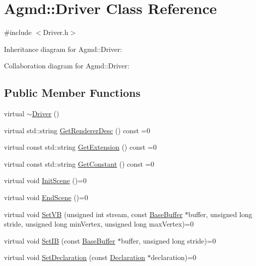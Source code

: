 \hypertarget{class_agmd_1_1_driver}{\section{Agmd\+:\+:Driver Class Reference}
\label{class_agmd_1_1_driver}
}


{\ttfamily \#include $<$Driver.\+h$>$}



Inheritance diagram for Agmd\+:\+:Driver\+:


Collaboration diagram for Agmd\+:\+:Driver\+:
\subsection*{Public Member Functions}
\begin{DoxyCompactItemize}
\item 
virtual \hyperlink{class_agmd_1_1_driver_acd6fcffe1c271f55b8b5c0b89c540f53}{$\sim$\+Driver} ()
\item 
virtual std\+::string \hyperlink{class_agmd_1_1_driver_a35c8501ea4154ef1f9dfd6dfb04d6b7d}{Get\+Renderer\+Desc} () const =0
\item 
virtual const std\+::string \hyperlink{class_agmd_1_1_driver_a57ef5797a34bc3f9ed10fd05c319c155}{Get\+Extension} () const =0
\item 
virtual const std\+::string \hyperlink{class_agmd_1_1_driver_a16e778a171f2e45f55b3ab6391db69d6}{Get\+Constant} () const =0
\item 
virtual void \hyperlink{class_agmd_1_1_driver_aff07d992edd330c24c177b4532f93218}{Init\+Scene} ()=0
\item 
virtual void \hyperlink{class_agmd_1_1_driver_a0616e055795e47e62fb71cce5c85c38a}{End\+Scene} ()=0
\item 
virtual void \hyperlink{class_agmd_1_1_driver_a54fa3d9aa9b5c3175bc2f4fc487f38fd}{Set\+V\+B} (unsigned int stream, const \hyperlink{class_agmd_1_1_base_buffer}{Base\+Buffer} $\ast$buffer, unsigned long stride, unsigned long min\+Vertex, unsigned long max\+Vertex)=0
\item 
virtual void \hyperlink{class_agmd_1_1_driver_adee1250e06ad2ac3d97a839076a52941}{Set\+I\+B} (const \hyperlink{class_agmd_1_1_base_buffer}{Base\+Buffer} $\ast$buffer, unsigned long stride)=0
\item 
virtual void \hyperlink{class_agmd_1_1_driver_a302ea30a784d1eadd3f317f33a86ca71}{Set\+Declaration} (const \hyperlink{class_agmd_1_1_declaration}{Declaration} $\ast$declaration)=0
\item 

\end{DoxyCompactItemize}
